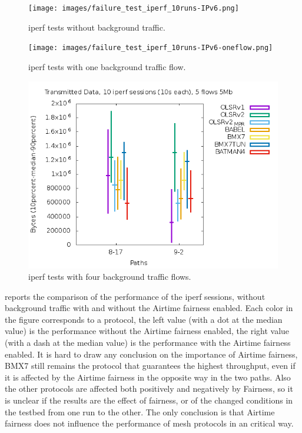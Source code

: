 \documentclass[10pt,onecolumn]{paper}
\begin{document}
\begin{figure}[!htb]
  \centering
    \texttt{[image: images/failure\_test\_iperf\_10runs-IPv6.png]}
    \caption{iperf tests without background traffic.}
  \label{fig:iperfnoflows}
\end{figure}

\begin{figure}[!htb]
  \centering
    \texttt{[image: images/failure\_test\_iperf\_10runs-IPv6-oneflow.png]}
    \caption{iperf tests with one background traffic flow.}
  \label{fig:iperfoneflow}
\end{figure}

\begin{figure}[!htb]
  \centering
    \includegraphics[width=.9\linewidth]{images/failure_test_iperf_10runs-IPv6-twoflow.png}
    \caption{iperf tests with four background traffic flows.}
  \label{fig:iperffourflows}
\end{figure}

 reports the comparison of the performance of the iperf
sessions, without background traffic with and without the Airtime fairness
enabled. Each color in the figure corresponds to a protocol, the left value
(with a dot at the median value) is the performance without the Airtime fairness
enabled, the right value (with a dash at the median value) is the performance
with the Airtime fairness enabled. It is hard to draw any conclusion on the
importance of Airtime fairness, BMX7 still remains the protocol that guarantees
the highest throughput, even if it is affected by the Airtime fairness in the
opposite way in the two paths. Also the other protocols are affected both positively
and negatively by Fairness, so it is unclear if the results are the effect of
fairness, or of the changed conditions in the testbed from one run to the other.
The only conclusion is that Airtime fairness does not influence the performance
of mesh protocols in an critical way. 
\end{document}
